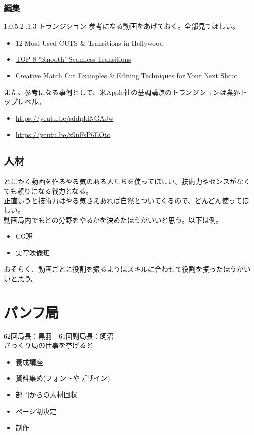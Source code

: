 \documentclass[dvipdfmx,jb5]{jarticle}
\makeatletter
\newcommand{\subsubsubsection}{\@startsection{paragraph}{4}{\z@}%
    {1.0\Cvs \@plus.5\Cdp \@minus.2\Cdp}%
    {.1\Cvs \@plus.3\Cdp}%
    {\large \bfseries}
  }
\newcommand{\link}[2]{\href{#2}{#1}}
\makeatother
\begin{document}
  \subsubsection{編集}
  \subsubsubsection{トランジション}
   参考になる動画をあげておく。全部見てほしい。
   \begin{itemize}
   \item \link{12 Most Used CUTS \& Transitions in Hollywood}{https://youtu.be/VVTZNg-IgGI}
   \item \link{TOP 8 "Smooth" Seamless Transitions}{https://youtu.be/t5k7feqZUD0}
   \item \link{Creative Match Cut Examples \& Editing Techniques for Your Next Shoot}{https://youtu.be/ptXlYulVAsM}
   \end{itemize}
   また、参考になる事例として、米Apple社の基調講演のトランジションは業界トップレベル。
   \begin{itemize}
    \item \url{https://youtu.be/sddpldNGAJw}
    \item \url{https://youtu.be/z9nFsP6EQto}
   \end{itemize}
 \subsection{人材}
 とにかく動画を作るやる気のある人たちを使ってほしい。技術力やセンスがなくても頼りになる戦力となる。\\
 正直いうと技術力はやる気さえあれば自然とついてくるので、どんどん使ってほしい。\\
 動画局内でもどの分野をやるかを決めたほうがいいと思う。以下は例。
 \begin{itemize}
 \item CG班
 \item 実写映像班
 \end{itemize}
 おそらく、動画ごとに役割を振るよりはスキルに合わせて役割を振ったほうがいいと思う。
 
 \section{パンフ局}
  62回局長：黒羽　61回副局長：飼沼\\
 ざっくり局の仕事を挙げると
 \begin{itemize}
   \item 養成講座
   \item 資料集め(フォントやデザイン)
   \item 部門からの素材回収
   \item ページ割決定
   \item 制作
 \end{itemize}
\end{document}
